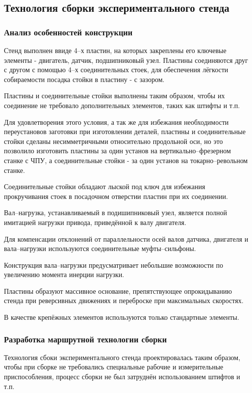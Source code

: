 \newpage
\subsection{Технология сборки экспериментального стенда}
\subsubsection{Анализ особенностей конструкции}

Стенд выполнен ввиде 4--х пластин, на которых закреплены его ключевые элементы -
двигатель, датчик, подшипниковый узел. Пластины соединяются друг с другом с помощью
4--х соединительных стоек, для обеспечения лёгкости собираемости посадка стойки в
пластину - с зазором.

Пластины и соединительные стойки выполнены таким образом, чтобы их соединение
не требовало дополнительных элементов, таких как штифты и т.п.

Для удовлетворения этого условия, а так же для избежания необходимости
переустановов заготовки при изготовлении деталей, пластины и соединительные стойки
сделаны несимметричными относительно продольной оси, но это позволило изготовить
пластины за один установ на вертикально--фрезерном станке с ЧПУ, а соединительные
стойки - за один установ на токарно--револьном станке.

Соединительные стойки обладают лыской под ключ для избежания прокручивания стоек
в посадочном отверстии пластин при их соединении.

Вал--нагрузка, устанавливаемый в подишипниковый узел, является полной имитацией
нагрузки привода, приведённой к валу двигателя.

Для компенсации отклонений от параллельности осей валов датчика, двигателя и
вала--нагрузки используются соединительные муфты--сильфоны.

Конструкция вала--нагрузки предусматривает небольшие возможности по увеличению
момента инерции нагрузки.

Пластины образуют массивное основание, препятствующее опрокидыванию стенда
при реверсивных движениях и переброске при максимальных скоростях.

В качестве крепёжных элементов используются только стандартные элементы.

\subsubsection{Разработка маршрутной технологии сборки}

Технология сбоки экспериментального стенда проектировалась таким образом,
чтобы при сборке не требовались специальные рабочие и измерительные приспособления,
процесс сборки не был затруднён использованием штифтов и т.п.
